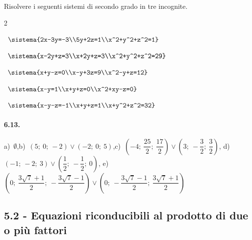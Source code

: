 \begin{esercizio}[*]
\label{ese:6.13}
Risolvere i seguenti sistemi di secondo grado in tre incognite.
\begin{htmulticols}{2}
\begin{enumeratea}

\item~\(\sistema{2x-3y=-3\\5y+2z=1\\x^2+y^2+z^2=1}\)



\item~\(\sistema{x-2y+z=3\\x+2y+z=3\\x^2+y^2+z^2=29}\)

\item~\(\sistema{x+y-z=0\\x-y+3z=9\\x^2-y+z=12}\)


\item~\(\sistema{x-y=1\\x+y+z=0\\x^2+xy-z=0}\)


\item~\(\sistema{x-y-z=-1\\x+y+z=1\\x+y^2+z^2=32}\)
\end{enumeratea}
\end{htmulticols}
\end{esercizio}

\paragraph{6.13.} a)~\(\emptyset\),\quad b)~\(\left(5;~0;~-2\right)\vee 
\left(-2;~0;~5\right)\),\quad c)~\(\left(-4;~\dfrac{25} 2;~\dfrac{17} 
2\right)\vee 
\left(3;~-\dfrac 3 2;~\dfrac 3 2\right)\),\quad 
d)~\(\left(-1;~-2;~3\right)\vee 
\left(\dfrac 1 2;~-\dfrac 1 2;~0\right)\),\quad 
e)~\(\left(0;~\dfrac{3\sqrt 
7+1} 
2;~-\dfrac{3\sqrt 7-1} 2\right)\vee \left(0;~-\dfrac{3\sqrt 7-1} 
2;~\dfrac{3\sqrt 7+1} 
2\right)\)

\subsection*{5.2 - Equazioni riconducibili al prodotto di due o più 
fattori}

